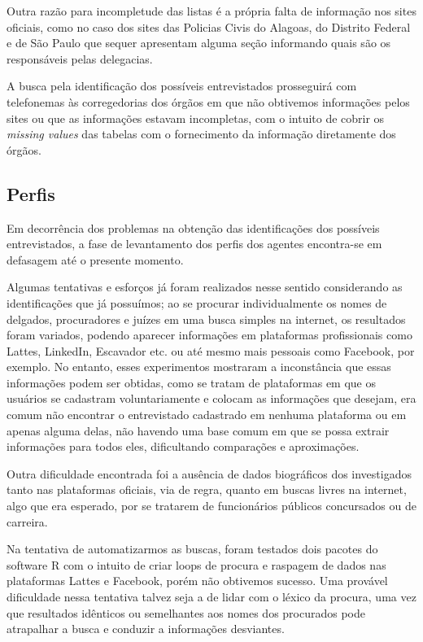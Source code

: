 \documentclass[12pt]{article}
\begin{document}
Outra razão para incompletude das listas é a própria falta de informação
nos sites oficiais, como no caso dos sites das Policias Civis do
Alagoas, do Distrito Federal e de São Paulo que sequer apresentam alguma
seção informando quais são os responsáveis pelas delegacias.

A busca pela identificação dos possíveis entrevistados prosseguirá com
telefonemas às corregedorias dos órgãos em que não obtivemos informações
pelos sites ou que as informações estavam incompletas, com o intuito de
cobrir os \emph{missing values} das tabelas com o fornecimento da
informação diretamente dos órgãos.

\subsection{Perfis}\label{perfis}

Em decorrência dos problemas na obtenção das identificações dos
possíveis entrevistados, a fase de levantamento dos perfis dos agentes
encontra-se em defasagem até o presente momento.

Algumas tentativas e esforços já foram realizados nesse sentido
considerando as identificações que já possuímos; ao se procurar
individualmente os nomes de delgados, procuradores e juízes em uma busca
simples na internet, os resultados foram variados, podendo aparecer
informações em plataformas profissionais como Lattes, LinkedIn,
Escavador etc. ou até mesmo mais pessoais como Facebook, por exemplo. No
entanto, esses experimentos mostraram a inconstância que essas
informações podem ser obtidas, como se tratam de plataformas em que os
usuários se cadastram voluntariamente e colocam as informações que
desejam, era comum não encontrar o entrevistado cadastrado em nenhuma
plataforma ou em apenas alguma delas, não havendo uma base comum em que
se possa extrair informações para todos eles, dificultando comparações e
aproximações.

Outra dificuldade encontrada foi a ausência de dados biográficos dos
investigados tanto nas plataformas oficiais, via de regra, quanto em
buscas livres na internet, algo que era esperado, por se tratarem de
funcionários públicos concursados ou de carreira.

Na tentativa de automatizarmos as buscas, foram testados dois pacotes do
software R com o intuito de criar loops de procura e raspagem de dados
nas plataformas Lattes e Facebook, porém não obtivemos sucesso. Uma
provável dificuldade nessa tentativa talvez seja a de lidar com o léxico
da procura, uma vez que resultados idênticos ou semelhantes aos nomes
dos procurados pode atrapalhar a busca e conduzir a informações
desviantes.
\end{document}
